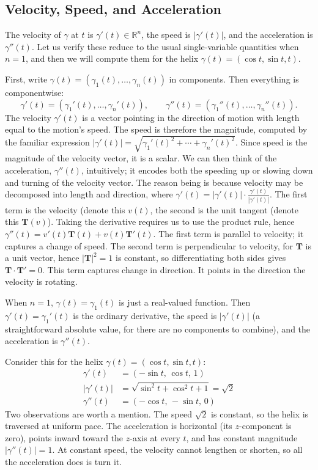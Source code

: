 \documentclass{article}
\begin{document}
\subsection{Velocity, Speed, and Acceleration}

The velocity of $\gamma$ at $t$ is $\gamma'(t) \in \mathbb{R}^n$, the speed is $|\gamma'(t)|$, and the acceleration is $\gamma''(t)$. Let us verify  these reduce to the usual single-variable quantities when $n = 1$, and then we will compute them for the helix $\gamma(t) = (\cos t, \sin t, t)$.

First, write $\gamma(t) = (\gamma_1(t), \ldots, \gamma_n(t))$ in components. Then everything is componentwise:
$$\gamma'(t) = (\gamma_1'(t), \ldots, \gamma_n'(t)), \qquad \gamma''(t) = (\gamma_1''(t), \ldots, \gamma_n''(t)).$$
The velocity $\gamma'(t)$ is a vector pointing in the direction of motion with length equal to the motion's speed. The speed is therefore the magnitude, computed by the familiar expression $|\gamma'(t)| = \sqrt{\gamma_1'(t)^2 + \cdots + \gamma_n'(t)^2}$. Since speed is the magnitude of the velocity vector, it is a scalar. We can then think of the acceleration, $\gamma''(t)$, intuitively; it encodes both the speeding up or slowing down and turning of the velocity vector. The reason being is because velocity may be decomposed into length and direction, where $\gamma '(t)=|\gamma'(t)| \cdot \frac{\gamma'(t)}{|\gamma'(t)|}$. The first term is the velocity (denote this $v(t)$, the second is the unit tangent (denote this $\textbf{T}(v)$). Taking the derivative requires us to use the product rule, hence $\gamma''(t)=v'(t)\textbf{T}(t)+v(t)\textbf{T}'(t)$. The first term is parallel to velocity; it captures a change of speed. The second term is perpendicular to velocity, for $\mathbf{T}$ is a unit vector, hence $|\mathbf{T}|^2 = 1$ is constant, so differentiating both sides gives $\mathbf{T} \cdot \mathbf{T}' = 0$. This term captures change in direction. It points in the direction the velocity is rotating. 

When $n = 1$, $\gamma(t) = \gamma_1(t)$ is just a real-valued function. Then $\gamma'(t) = \gamma_1'(t)$ is the ordinary derivative, the speed is $|\gamma'(t)|$ (a straightforward absolute value, for there are no components to combine), and the acceleration is $\gamma''(t)$. 

Consider this for the helix $\gamma(t) = (\cos t, \sin t, t)$:
\begin{align*}
    \gamma'(t) &= (-\sin t,\, \cos t,\, 1) \\
    |\gamma'(t)| &= \sqrt{\sin^2 t + \cos^2 t + 1} = \sqrt{2} \\
    \gamma''(t) &= (-\cos t,\, -\sin t,\, 0)
\end{align*}
Two observations are worth a mention. The speed $\sqrt{2}$ is constant, so the helix is traversed at uniform pace. The acceleration is horizontal (its $z$-component is zero), points inward toward the $z$-axis at every $t$, and has constant magnitude $|\gamma''(t)| = 1$. At constant speed, the velocity cannot lengthen or shorten, so all the acceleration does is turn it.
\end{document}
